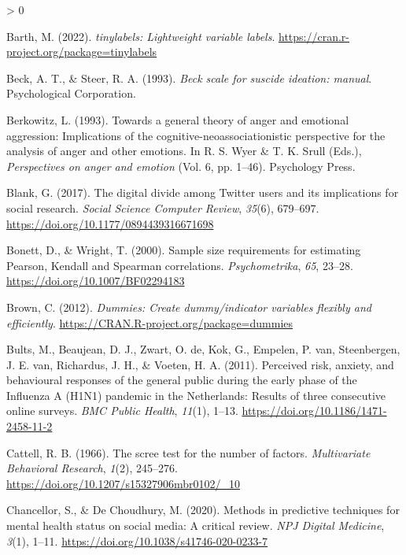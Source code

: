 \documentclass[
  english,
  jou,floatsintext]{apa7}
\newlength{\cslhangindent}
\newenvironment{CSLReferences}[2] %
 {%
  \setlength{\parindent}{0pt}
  \ifodd #1 \everypar{\setlength{\hangindent}{\cslhangindent}}\ignorespaces\fi
  \ifnum #2 > 0
  \setlength{\parskip}{#2\baselineskip}
  \fi
 }%
 {}
\begin{document}
\begin{CSLReferences}{1}{0}
\leavevmode\hypertarget{ref-R-tinylabels}{}%
Barth, M. (2022). \emph{{tinylabels}: Lightweight variable labels}. \url{https://cran.r-project.org/package=tinylabels}

\leavevmode\hypertarget{ref-beck1993}{}%
Beck, A. T., \& Steer, R. A. (1993). \emph{Beck scale for suscide ideation: manual}. Psychological Corporation.

\leavevmode\hypertarget{ref-Berkowitz1993}{}%
Berkowitz, L. (1993). Towards a general theory of anger and emotional aggression: Implications of the cognitive-neoassociationistic perspective for the analysis of anger and other emotions. In R. S. Wyer \& T. K. Srull (Eds.), \emph{Perspectives on anger and emotion} (Vol. 6, pp. 1--46). Psychology Press.

\leavevmode\hypertarget{ref-Blank2017}{}%
Blank, G. (2017). The digital divide among {Twitter} users and its implications for social research. \emph{Social Science Computer Review}, \emph{35}(6), 679--697. \url{https://doi.org/10.1177/0894439316671698}

\leavevmode\hypertarget{ref-Bonett2000}{}%
Bonett, D., \& Wright, T. (2000). Sample size requirements for estimating {Pearson, Kendall and Spearman} correlations. \emph{Psychometrika}, \emph{65}, 23--28. \url{https://doi.org/10.1007/BF02294183}

\leavevmode\hypertarget{ref-R-dummies}{}%
Brown, C. (2012). \emph{Dummies: Create dummy/indicator variables flexibly and efficiently}. \url{https://CRAN.R-project.org/package=dummies}

\leavevmode\hypertarget{ref-bults2011}{}%
Bults, M., Beaujean, D. J., Zwart, O. de, Kok, G., Empelen, P. van, Steenbergen, J. E. van, Richardus, J. H., \& Voeten, H. A. (2011). Perceived risk, anxiety, and behavioural responses of the general public during the early phase of the {Influenza A (H1N1)} pandemic in the {Netherlands}: Results of three consecutive online surveys. \emph{BMC Public Health}, \emph{11}(1), 1--13. \url{https://doi.org/10.1186/1471-2458-11-2}

\leavevmode\hypertarget{ref-Cattell1966}{}%
Cattell, R. B. (1966). The scree test for the number of factors. \emph{Multivariate Behavioral Research}, \emph{1}(2), 245--276. \url{https://doi.org/10.1207/s15327906mbr0102/_10}

\leavevmode\hypertarget{ref-chancellor2020methods}{}%
Chancellor, S., \& De Choudhury, M. (2020). Methods in predictive techniques for mental health status on social media: A critical review. \emph{NPJ Digital Medicine}, \emph{3}(1), 1--11. \url{https://doi.org/10.1038/s41746-020-0233-7}


\end{CSLReferences}
\end{document}
